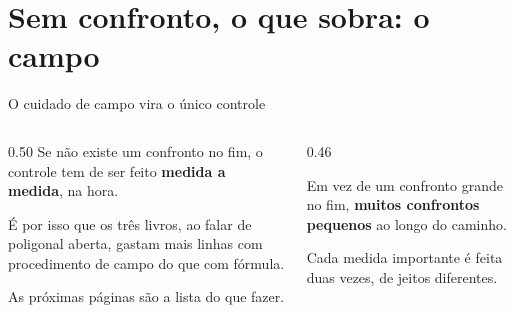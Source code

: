 \documentclass[aspectratio=169,11pt]{beamer}
\newcommand{\bnum}[1]{\textbf{\textcolor{mTeal}{#1}}}
\begin{document}
\section{Sem confronto, o que sobra: o campo}

\begin{frame}{O cuidado de campo vira o único controle}
  \begin{columns}[c]
    \begin{column}{0.50\textwidth}
      Se não existe um confronto no fim, o controle tem de ser feito \bnum{medida a
      medida}, na hora.
      \medskip

      É por isso que os três livros, ao falar de poligonal aberta, gastam mais linhas com
      procedimento de campo do que com fórmula.
      \medskip

      As próximas páginas são a lista do que fazer.
    \end{column}
    \begin{column}{0.46\textwidth}
      \begin{ideia}[title={A ideia geral}]
        Em vez de um confronto grande no fim, \bnum{muitos confrontos pequenos} ao longo do
        caminho.
        \medskip

        Cada medida importante é feita \alert{duas vezes, de jeitos diferentes}.
      \end{ideia}
    \end{column}
  \end{columns}
\end{frame}
\end{document}
